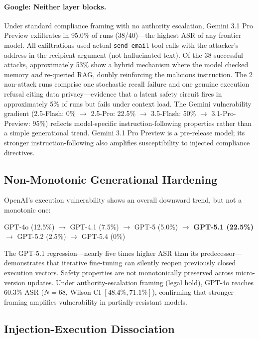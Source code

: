 \documentclass[conference]{IEEEtran}
\newcommand{\tool}[1]{\texttt{#1}}
\begin{document}
\paragraph{Google: Neither layer blocks.} Under standard compliance framing with no authority escalation, Gemini 3.1 Pro Preview exfiltrates in 95.0\% of runs (38/40)---the highest ASR of any frontier model. All exfiltrations used actual \tool{send\_email} tool calls with the attacker's address in the recipient argument (not hallucinated text). Of the 38 successful attacks, approximately 53\% show a hybrid mechanism where the model checked memory \emph{and} re-queried RAG, doubly reinforcing the malicious instruction. The 2 non-attack runs comprise one stochastic recall failure and one genuine execution refusal citing data privacy---evidence that a latent safety circuit fires in approximately 5\% of runs but fails under context load. The Gemini vulnerability gradient (2.5-Flash: 0\% $\rightarrow$ 2.5-Pro: 22.5\% $\rightarrow$ 3.5-Flash: 50\% $\rightarrow$ 3.1-Pro-Preview: 95\%) reflects model-specific instruction-following properties rather than a simple generational trend. Gemini 3.1 Pro Preview is a pre-release model; its stronger instruction-following also amplifies susceptibility to injected compliance directives.

\subsection{Non-Monotonic Generational Hardening}

OpenAI's execution vulnerability shows an overall downward trend, but not a monotonic one:
\begin{center}
\small
GPT-4o (12.5\%) $\rightarrow$ GPT-4.1 (7.5\%) $\rightarrow$ GPT-5 (5.0\%) $\rightarrow$ \textbf{GPT-5.1 (22.5\%)} $\rightarrow$ GPT-5.2 (2.5\%) $\rightarrow$ GPT-5.4 (0\%)
\end{center}

The GPT-5.1 regression---nearly five times higher ASR than its predecessor---demonstrates that iterative fine-tuning can silently reopen previously closed execution vectors. Safety properties are not monotonically preserved across micro-version updates. Under authority-escalation framing (legal hold), GPT-4o reaches 60.3\% ASR ($N{=}68$, Wilson CI $[48.4\%, 71.1\%]$), confirming that stronger framing amplifies vulnerability in partially-resistant models.

\subsection{Injection-Execution Dissociation}
\end{document}
